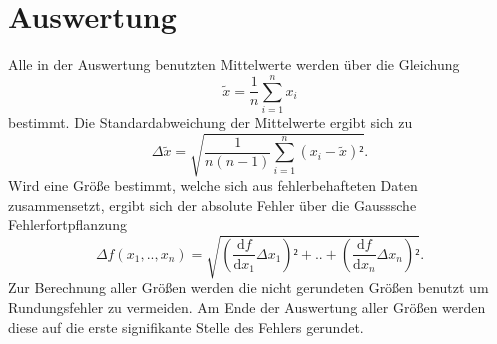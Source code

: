 \section{Auswertung}
\label{sec:Auswertung}
Alle in der Auswertung benutzten Mittelwerte werden über die Gleichung
\begin{equation}
\tilde{x}=\frac{1}{n}\sum_{i=1}^n {x_i}
\end{equation}
bestimmt. Die Standardabweichung der Mittelwerte ergibt sich zu 
\begin{equation}
\Delta{\tilde{x}}=\sqrt{\frac{1}{n(n-1)}\sum_{i=1}^n {(x_i-\tilde{x})²}}.
\end{equation}
Wird eine Größe bestimmt, welche sich aus fehlerbehafteten Daten zusammensetzt, ergibt sich der absolute Fehler über die Gausssche Fehlerfortpflanzung 
\begin{equation}
\Delta{f}(x_1,..,x_n)=\sqrt{\left(\frac{\mathup{d}f}{\mathup{d}x_1}\Delta{x_1}\right)²+..+\left(\frac{\mathup{d}f}{\mathup{d}x_n}\Delta{x_n}\right)²}.
\end{equation}
Zur Berechnung aller Größen werden die nicht gerundeten Größen benutzt um Rundungsfehler zu vermeiden. Am Ende der Auswertung aller Größen werden diese auf die erste signifikante Stelle des Fehlers gerundet. 

